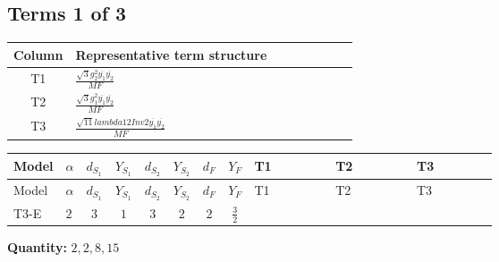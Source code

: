 \documentclass[8pt]{article}
\begin{document}
\begin{landscape}
\subsection*{Terms 1 of 3}
\begin{center}
\begin{tabular}{@{}c >{\raggedright\arraybackslash}p{0.82\linewidth}@{}}
\toprule
Column & Representative term structure \\
\midrule
T1 & \(\displaystyle \frac{\sqrt{3} g_{2}^{2} \overline{y_{1}} \overline{y_{2}}}{MF}\) \\
\midrule
T2 & \(\displaystyle \frac{\sqrt{3} g_{1}^{2} \overline{y_{1}} \overline{y_{2}}}{MF}\) \\
\midrule
T3 & \(\displaystyle \frac{\sqrt{11} lambda12Inv2 \overline{y_{1}} \overline{y_{2}}}{MF}\) \\
\midrule
\bottomrule
\end{tabular}
\end{center}
\smallskip
\tiny
\begin{longtable}{@{}llcccccc >{\raggedright\arraybackslash}p{0.21\linewidth} >{\raggedright\arraybackslash}p{0.21\linewidth} >{\raggedright\arraybackslash}p{0.21\linewidth}@{}}
\toprule
Model & $\alpha$ & $d_{S_1}$ & $Y_{S_1}$ & $d_{S_2}$ & $Y_{S_2}$ & $d_F$ & $Y_F$ & T1 & T2 & T3 \\
\midrule
\endfirsthead
\toprule
Model & $\alpha$ & $d_{S_1}$ & $Y_{S_1}$ & $d_{S_2}$ & $Y_{S_2}$ & $d_F$ & $Y_F$ & T1 & T2 & T3 \\
\midrule
\endhead
T3-E & $2$ & $3$ & $1$ & $3$ & $2$ & $2$ & $\frac{3}{2}$ & \scriptsize\adjustbox{max width=\linewidth}{$\begin{gathered} - \frac{49 \sqrt{3} g_{2}^{2} \overline{y_{1}} \overline{y_{2}}}{24 MF}\end{gathered}$} & \scriptsize\adjustbox{max width=\linewidth}{$\begin{gathered} - \frac{9 \sqrt{3} g_{1}^{2} \overline{y_{1}} \overline{y_{2}}}{8 MF}\end{gathered}$} & \scriptsize\adjustbox{max width=\linewidth}{$\begin{gathered} - \frac{3 \sqrt{11} lambda12Inv2 \overline{y_{1}} \overline{y_{2}}}{22 MF}\end{gathered}$} \\
\midrule
\bottomrule
\end{longtable}
\clearpage
\noindent\textbf{Quantity: }$\mathrm{2,2,8,15}$\par\smallskip

\end{landscape}
\end{document}
